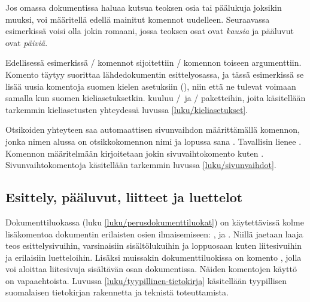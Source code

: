 Jos omassa dokumentissa haluaa kutsua teoksen osia tai päälukuja
joksikin muuksi, voi määritellä edellä mainitut komennot uudelleen.
Seuraavassa esimerkissä voisi olla jokin romaani, jossa teoksen osat
ovat \emph{kausia} ja pääluvut ovat \emph{päiviä}.

\begin{koodilohkosis}
\addto{\captionsfinnish}{
  \renewcommand{\partname}{Kausi}
  \renewcommand{\chaptername}{Päivä}
}
\end{koodilohkosis}

\noindent
Edellisessä esimerkissä \-/ komennot sijoitettiin
\-/ komennon toiseen argumenttiin. Komento
 täytyy suorittaa lähdedokumentin esittelyosassa, ja
tässä esimerkissä se lisää uusia komentoja suomen kielen asetuksiin
(), niin että ne tulevat voimaan samalla kun
suomen kieliasetuksetkin.  kuuluu
\-/\ ja \-/ paketteihin, joita
käsitellään tarkemmin kieliasetusten yhteydessä luvussa
\ref{luku/kieliasetukset}.

Otsikoiden yhteyteen saa automaattisen sivunvaihdon määrittämällä
komennon, jonka nimen alussa on otsikkokomennon nimi ja lopussa sana
. Tavallisin lienee . Komennon
määritelmään kirjoitetaan jokin sivuvaihtokomento kuten
. Sivunvaihtokomentoja käsitellään tarkemmin luvussa
\ref{luku/sivunvaihdot}.

\begin{koodilohkosis}
\newcommand{\sectionbreak}{\clearpage}
\end{koodilohkosis}

\subsection{Esittely, pääluvut, liitteet ja luettelot}
\label{luku/frontmainbackmatter}

Dokumenttiluokassa  (luku \ref{luku/perusdokumenttiluokat})
on käytettävissä kolme lisäkomentoa dokumentin erilaisten osien
ilmaisemiseen: ,  ja
. Niillä jaetaan laaja teos esittelysivuihin,
varsinaisiin sisältölukuihin ja loppuosaan kuten liitesivuihin ja
erilaisiin luetteloihin. Lisäksi muissakin dokumenttiluokissa on komento
, jolla voi aloittaa liitesivuja sisältävän osan
dokumentissa. Näiden komentojen käyttö on vapaaehtoista. Luvussa
\ref{luku/tyypillinen-tietokirja} käsitellään tyypillisen suomalaisen
tietokirjan rakennetta ja teknistä toteuttamista.

